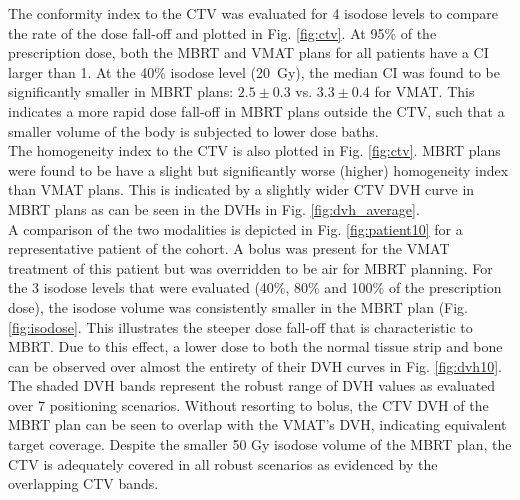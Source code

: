 \documentclass[aapm,graphicx,superscriptaddress]{revtex4-1}
\begin{document}
The conformity index to the CTV was evaluated for 4 isodose levels to compare the rate of the dose fall-off and plotted in Fig. \ref{fig:ctv}. At 95\% of the prescription dose, both the MBRT and VMAT plans for all patients have a CI larger than 1. At the 40\% isodose level (20~Gy), the median CI was found to be significantly smaller in MBRT plans: $2.5\pm0.3$ vs. $3.3\pm0.4$ for VMAT. This indicates a more rapid dose fall-off in MBRT plans outside the CTV, such that a smaller volume of the body is subjected to lower dose baths. \\
The homogeneity index to the CTV is also plotted in Fig. \ref{fig:ctv}. MBRT plans were found to be have a slight but significantly worse (higher) homogeneity index than VMAT plans. This is indicated by a slightly wider CTV DVH curve in MBRT plans as can be seen in the DVHs in Fig. \ref{fig:dvh_average}.\\

A comparison of the two modalities is depicted in Fig. \ref{fig:patient10} for a representative patient of the cohort. A bolus was present for the VMAT treatment of this patient but was overridden to be air for MBRT planning. For the 3 isodose levels that were evaluated (40\%, 80\% and 100\% of the prescription dose), the isodose volume was consistently smaller in the MBRT plan (Fig. \ref{fig:isodose}. This illustrates the steeper dose fall-off that is characteristic to MBRT. Due to this effect, a lower dose to both the normal tissue strip and bone can be observed over almost the entirety of their DVH curves in Fig. \ref{fig:dvh10}. The shaded DVH bands represent the robust range of DVH values as evaluated over 7 positioning scenarios. Without resorting to bolus, the CTV DVH of the MBRT plan can be seen to overlap with the VMAT's DVH, indicating equivalent target coverage. Despite the smaller 50 Gy isodose volume of the MBRT plan, the CTV is adequately covered in all robust scenarios as evidenced by the overlapping CTV bands.
\end{document}
